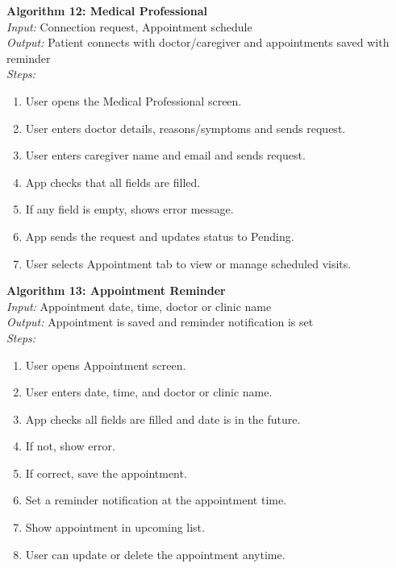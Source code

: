 \textbf{Algorithm 12: Medical Professional}\\
\textit{Input:} Connection request, Appointment schedule\\
\textit{Output:} Patient connects with doctor/caregiver and appointments saved with reminder\\
\textit{Steps:}
\begin{enumerate}
    \item User opens the Medical Professional screen.
    \item User enters doctor details, reasons/symptoms and sends request.
    \item User enters caregiver name and email and sends request.
    \item App checks that all fields are filled.
    \item If any field is empty, shows error message.
    \item App sends the request and updates status to Pending.
    \item User selects Appointment tab to view or manage scheduled visits.
\end{enumerate}

\textbf{Algorithm 13: Appointment Reminder}\\
\textit{Input:} Appointment date, time, doctor or clinic name\\
\textit{Output:} Appointment is saved and reminder notification is set\\
\textit{Steps:}
\begin{enumerate}
    \item User opens Appointment screen.
    \item User enters date, time, and doctor or clinic name.
    \item App checks all fields are filled and date is in the future.
    \item If not, show error.
    \item If correct, save the appointment.
    \item Set a reminder notification at the appointment time.
    \item Show appointment in upcoming list.
    \item User can update or delete the appointment anytime.
\end{enumerate}

